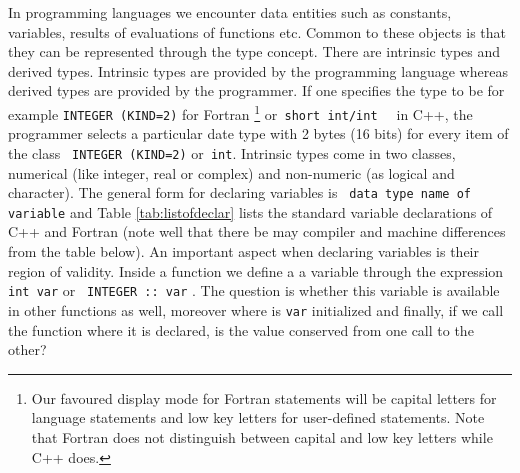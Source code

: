 In programming languages
we encounter data entities such
as constants, variables, results of evaluations of functions
etc. Common to these objects is that they can be represented
through the type concept. There are intrinsic types and derived
types. Intrinsic types are provided by the programming language
whereas derived types are provided by the programmer.
If one specifies the type to be for example \verb?INTEGER (KIND=2)? 
for Fortran \footnote{Our favoured display mode for Fortran statements
will be capital letters for language statements and low key
letters for user-defined statements. Note that Fortran
does not distinguish between capital and low key letters while
C++ does.}
or\verb? short int/int  ? in C++,
the programmer selects a particular date type with 2 bytes
(16 bits) for every item of the class
\verb? INTEGER (KIND=2)? or\verb? int?. Intrinsic types come
in two classes, numerical (like integer, real or complex)
and non-numeric (as logical and character).
The general form for declaring  variables is 
\verb? data type name of variable?
and Table \ref{tab:listofdeclar} 
lists the standard variable declarations of C++ and Fortran 
(note well that there be may compiler and machine differences from the table below).
An important aspect when declaring variables is their
region of validity.
Inside a function we define a a variable through the expression 
\verb?int var? or \verb? INTEGER :: var? . The question is 
whether this variable is available in
other functions as well, moreover where is 
\verb?var? initialized and finally, if we call the function where
it is declared, is the value conserved from one call to the other?
